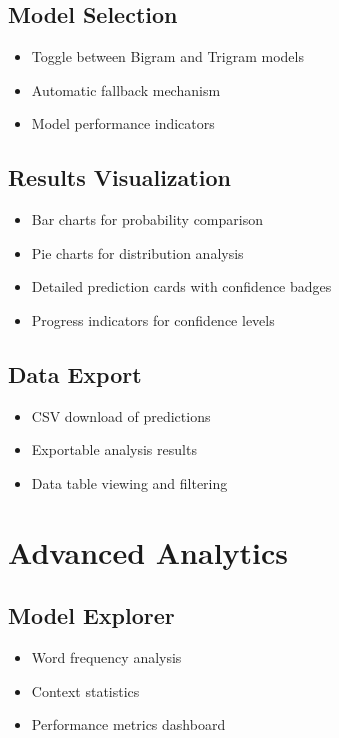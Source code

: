 \documentclass[12pt,a4paper]{report}
\begin{document}
\subsection{Model Selection}
\begin{itemize}
    \item Toggle between Bigram and Trigram models
    \item Automatic fallback mechanism
    \item Model performance indicators
\end{itemize}

\subsection{Results Visualization}
\begin{itemize}
    \item Bar charts for probability comparison
    \item Pie charts for distribution analysis
    \item Detailed prediction cards with confidence badges
    \item Progress indicators for confidence levels
\end{itemize}

\subsection{Data Export}
\begin{itemize}
    \item CSV download of predictions
    \item Exportable analysis results
    \item Data table viewing and filtering
\end{itemize}

\section{Advanced Analytics}

\subsection{Model Explorer}
\begin{itemize}
    \item Word frequency analysis
    \item Context statistics
    \item Performance metrics dashboard
\end{itemize}
\end{document}
